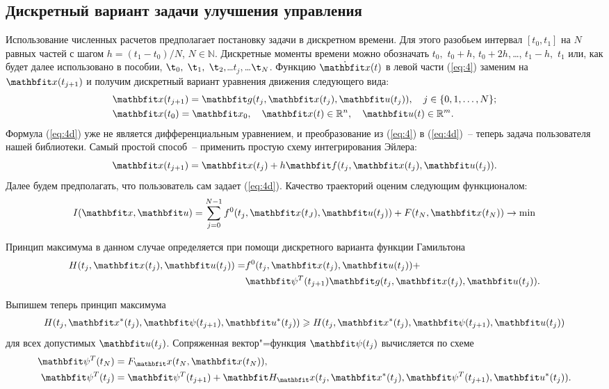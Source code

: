\documentclass[a4paper,14pt, openany, twoside, draft]{extbook} %
\begin{document}
\subsection{Дискретный вариант задачи улучшения управления}
\label{sec:discrete}

Использование численных расчетов предполагает постановку задачи в дискретном времени.  Для этого разобьем интервал $[t_0,t_1]$ на $N$ равных частей с шагом $h=(t_1-t_0)/N$, $N\in\mathbb{N}$.  Дискретные моменты времени можно обозначать $t_0,$ $t_0+h$, $t_0+2h,$\ldots, $t_1-h,$ $t_1$ или, как будет далее использовано в пособии, $\t_0,$ $\t_1,$ $\t_2,$\ldots $t_j,$\ldots $\t_N$.  Функцию $\dot{\vecx}(t)$ в левой части (\ref{eq:4}) заменим на $\vecx(t_{j+1})$ и получим дискретный вариант уравнения движения следующего вида:
\begin{align}
  \label{eq:4d}
  &\vecx(t_{j+1})=\vecg(t_j,\vecx(t_j),\vecu(t_j)),\quad j\in\{0,1,\ldots,N\};\\
  \label{eq:4dcond}
  &\vecx(t_0)=\vecx_0, \quad \vecx(t)\in\mathbb{R}^n,  \quad \vecu(t)\in\mathbb{R}^m.
\end{align}
Формула (\ref{eq:4d}) уже не является дифференциальным уравнением, и преобразование из (\ref{eq:4}) в (\ref{eq:4d})~-- теперь задача пользователя нашей библиотеки.  Самый простой способ~-- применить простую схему интегрирования Эйлера:
\begin{equation}
  \label{eq:4d1} \nonumber
  \vecx(t_{j+1})=\vecx(t_j)+h\vecf(t_j,\vecx(t_j),\vecu(t_j)).
\end{equation}
Далее будем предполагать, что пользователь сам задает (\ref{eq:4d}).  Качество траекторий оценим следующим функционалом:
\begin{equation}
  I(\vecx,\vecu)=\sum_{j=0}^{N-1}f^0(t_j,\vecx(t_J),\vecu(t_j))+F(t_N,\vecx(t_N)) \to \min
    \label{eq103}
\end{equation}

Принцип максимума в данном случае определяется при помощи дискретного варианта функции Гамильтона
\begin{align}
  H(t_j,\vecx(t_j),\vecu(t_j))=&f^0(t_j,\vecx(t_j),\vecu(t_j))+\nonumber\\
   &\vecpsi^T(t_{j+1})\vecg(t_j,\vecx(t_j),\vecu(t_j)).   \label{eq:descH}
\end{align}

Выпишем теперь принцип максимума
\begin{align}
  H(t_j,\vecx^*(t_j),\vecpsi(t_{j+1}),\vecu^*(t_j))\geqslant H(t_j,\vecx^*(t_j),\vecpsi(t_{j+1}),\vecu(t_j)) \label{eq:descMax}
\end{align}
для всех допустимых $\vecu(t_j)$.  Сопряженная вектор"=функция $\vecpsi(t_j)$ вычисляется по схеме
\begin{align}
  \label{eq:startPsi}
  \vecpsi^T(t_N)&=F_\vecx(t_N,\vecx(t_N)), \nonumber\\ \vecpsi^T(t_j)&=\vecpsi^T(t_{j+1})+\vecH_\vecx(t_j,\vecx^*(t_j),\vecpsi^T(t_{j+1}),\vecu^*(t_j)).
\end{align}
\end{document}
